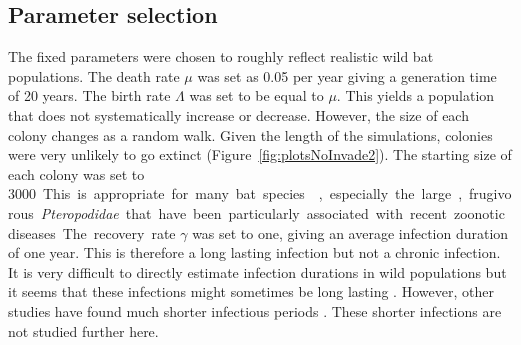 


























\subsection{Parameter selection}
\label{s:paramSelect}

The fixed parameters were chosen to roughly reflect realistic wild bat populations. 
The death rate $\mu$ was set as 0.05 per year giving a generation time of 20 years.
The birth rate $\Lambda$ was set to be equal to $\mu$.
This yields a population that does not systematically increase or decrease.
However, the size of each colony changes as a random walk.
Given the length of the simulations, colonies were very unlikely to go extinct (Figure~\ref{fig:plotsNoInvade2}).
The starting size of each colony was set to \SI{3000}. 
This is appropriate for many bat species \cite{jones2009pantheria}, especially the large, frugivorous \emph{Pteropodidae} that have been particularly associated with recent zoonotic diseases.

The recovery rate $\gamma$ was set to one, giving an average infection duration of one year. 
This is therefore a long lasting infection but not a chronic infection. 
It is very difficult to directly estimate infection durations in wild populations but it seems that these infections might sometimes be long lasting \cite{peel2012henipavirus, plowright2015ecological}.
However, other studies have found much shorter infectious periods \cite{amengual2007temporal}.
These shorter infections are not studied further here. %

